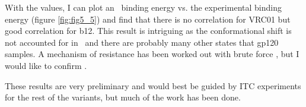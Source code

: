With the \ec values, I can plot an \silico~binding energy vs. the experimental binding energy (figure \ref{fig:fig5_5}) and find that there is no correlation for VRC01 but good correlation for b12. This result is intriguing as the conformational shift is not accounted for in \rosetta~and there are probably many other states that gp120 samples. A mechanism of resistance has been worked out with brute force \citep{Li:2011ea}, but I would like to confirm \silico.

These results are very preliminary and would best be guided by ITC experiments for the rest of the variants, but much of the work has been done.